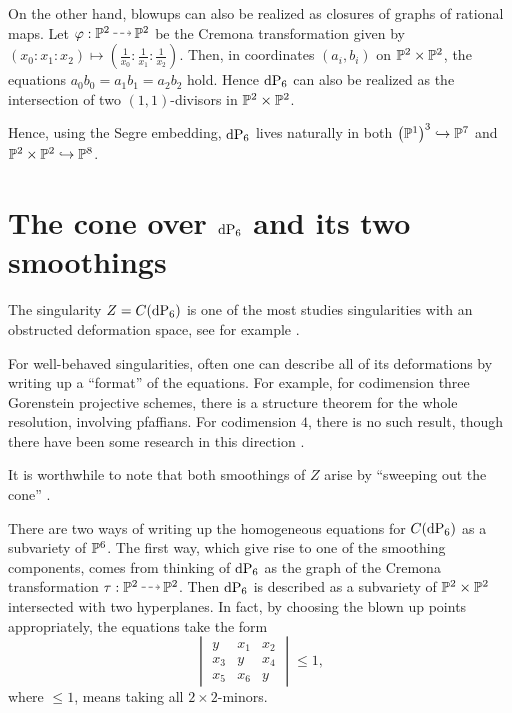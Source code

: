 On the other hand, blowups can also be realized as closures of graphs of rational maps. Let $\varphi: \P^2 \rmap \P^2$ be the Cremona transformation given by $(x_0:x_1:x_2) \mapsto \left( \frac 1{x_0}: \frac 1{x_1}:\frac 1{x_2} \right)$. Then, in coordinates $(a_i,b_i)$ on $\P^2 \times \P^2$, the equations $a_0b_0=a_1b_1=a_2b_2$ hold. Hence $\dP6$ can also be realized as the intersection of two $(1,1)$-divisors in $\P^2 \times \P^2$. 

Hence, using the Segre embedding, $\dP6$ lives naturally in both ${\left( \P^1 \right)}^3 \hookrightarrow \P^7$ and $\P^2 \times \P^2 \hookrightarrow \P^8$. 

\section{The cone over \texorpdfstring{$\dP6$}{dP6} and its two smoothings}

The singularity $Z=C(\dP6)$ is one of the most studies singularities with an obstructed deformation space, see for example \cite{altmann_versaldeformation}.


For well-behaved singularities, often one can describe all of its deformations by writing up a ``format'' of the equations. For example, for codimension three Gorenstein projective schemes, there is a structure theorem for the whole resolution, involving pfaffians. For codimension $4$, there is no such result, though there have been some research in this direction .

It is worthwhile to note that both smoothings of $Z$ arise by ``sweeping out the cone'' . 

There are two ways of writing up the homogeneous equations for $C(\dP6)$ as a subvariety of $\P^6$. The first way, which give rise to one of the smoothing components, comes from thinking of $\dP6$ as the graph of the Cremona transformation $\tau: \P^2 \rmap \P^2$. Then $\dP6$ is described as a subvariety of $\P^2 \times \P^2$ intersected with two hyperplanes. In fact, by choosing the blown up points appropriately, the equations take the form
\begin{equation}
\begin{vmatrix}
y & x_1 & x_2 \\
x_3 & y & x_4 \\
x_5 & x_6 & y
\end{vmatrix} \leq 1,
\end{equation}
where $\leq 1$, means taking all $2 \times 2$-minors.


